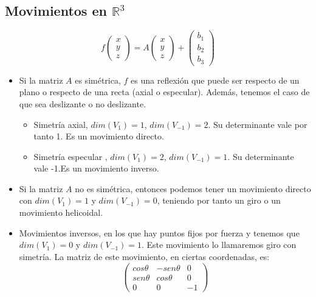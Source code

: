 \documentclass[11pt, a4paper, titlepage]{article}
\newcommand{\R}{\mathbb{R}}
\theoremstyle{theorem-style}
\theoremstyle{definition-style}
\theoremstyle{remark-style}
\theoremstyle{example-style}
\begin{document}

\subsection{Movimientos en $\R^3$}

\[
  f \begin{pmatrix}
    x\\
    y\\
    z
  \end{pmatrix} = A\begin{pmatrix}
    x\\
    y\\
    z
  \end{pmatrix} + \begin{pmatrix}
    b_1\\
    b_2\\
    b_3
  \end{pmatrix}
\]

\begin{itemize}
\item Si la matriz $A$ es simétrica, $f$ es una reflexión que puede ser respecto de un plano o respecto de una recta (axial o especular). Además, tenemos el caso de que sea deslizante o no deslizante.

  \begin{itemize}
  \item Simetría axial, $dim(V_1) = 1$, $dim(V_{-1}) =2$. Su determinante vale por tanto 1. Es un movimiento directo.
  \item Simetría especular , $dim(V_1) = 2$, $dim(V_{-1}) =1$. Su determinante vale -1.Es un movimiento inverso.
  \end{itemize}

\item Si la matriz $A$ no es simétrica, entonces podemos tener un movimiento directo con $dim(V_1) = 1$ y $dim(V_{-1})=0$, teniendo por tanto un giro o un movimiento helicoidal.
  
\item Movimientos inversos, en los que hay puntos fijos por fuerza y tenemos que $dim(V_1) = 0$ y $dim(V_{-1}) = 1$. Este movimiento lo llamaremos giro con simetría. La matriz de este movimiento, en ciertas coordenadas, es:
  \[
    \begin{pmatrix}
      cos \theta & -sen\theta  & 0\\
      sen\theta & cos\theta  & 0\\
      0 & 0 & -1
    \end{pmatrix} 
  \]
\end{itemize}
\end{document}
